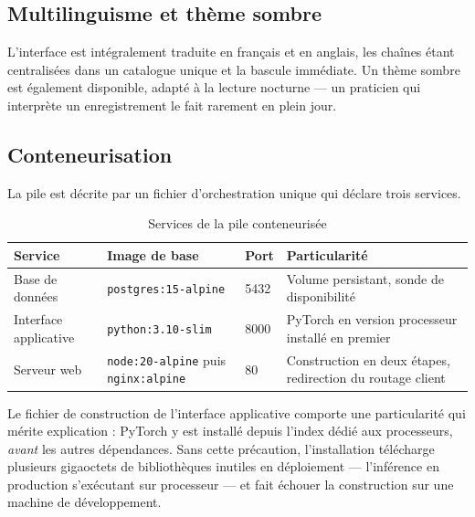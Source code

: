 
\subsection{Multilinguisme et thème sombre}

L'interface est intégralement traduite en français et en anglais, les chaînes étant centralisées
dans un catalogue unique et la bascule immédiate. Un thème sombre est également disponible,
adapté à la lecture nocturne --- un praticien qui interprète un enregistrement le fait rarement
en plein jour.


\subsection{Conteneurisation}

La pile est décrite par un fichier d'orchestration unique qui déclare trois services.

\begin{table}[H]
\centering

\small
\begin{tabular}{@{}lllL{5.4cm}@{}}
\toprule
\textbf{Service} & \textbf{Image de base} & \textbf{Port} & \textbf{Particularité} \\
\midrule
Base de données & \texttt{postgres:15-alpine} & 5432 &
Volume persistant, sonde de disponibilité \\
\addlinespace[2pt]
Interface applicative & \texttt{python:3.10-slim} & 8000 &
PyTorch en version processeur installé en premier \\
\addlinespace[2pt]
Serveur web & \texttt{node:20-alpine} puis \texttt{nginx:alpine} & 80 &
Construction en deux étapes, redirection du routage client \\
\bottomrule
\end{tabular}
\caption{Services de la pile conteneurisée}
\label{tab:services}
\end{table}

Le fichier de construction de l'interface applicative comporte une particularité qui mérite
explication : PyTorch y est installé depuis l'index dédié aux processeurs, \emph{avant} les
autres dépendances. Sans cette précaution, l'installation télécharge plusieurs gigaoctets de
bibliothèques inutiles en déploiement --- l'inférence en production s'exécutant sur processeur
--- et fait échouer la construction sur une machine de développement.

